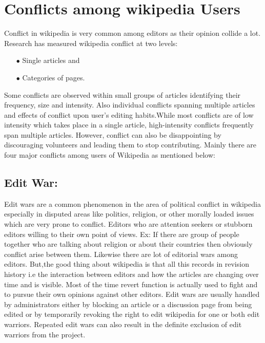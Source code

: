 \documentclass[12pt]{article}
\begin{document}
\section{Conflicts among wikipedia Users}
Conflict in wikipedia is very common among editors as their opinion collide a lot. Research has measured wikipedia conflict at two levels: 
\begin{itemize}
\item[$\bullet$ ]Single articles and
 \item[$\bullet$ ]Categories of pages.
\end{itemize}
Some conflicts are observed within small groups of articles identifying their frequency, size and intensity. Also individual conflicts spanning multiple articles and effects of conflict upon user's editing habits\cite{char}.While most conflicts are of low intensity which takes place in a single article, high-intensity conflicts frequently span multiple articles. However, conflict can also be disappointing by discouraging volunteers and leading them to stop contributing.
Mainly there are four major conflicts among users of Wikipedia \cite{main} as mentioned below:
\subsection*{Edit War:} Edit wars are a common phenomenon in the area of political conflict in wikipedia especially in disputed areas like politics, religion, or other morally loaded issues which are very prone to conflict. Editors who are attention seekers or stubborn editors willing to their own point of views. Ex: If there are group of people together who are talking about religion or about their countries  then  obviously conflict arise between them. Likewise there are lot of editorial wars among editors. But,the good thing about wikipedia is that all this records in revision history i.e the interaction between editors and how the articles are changing over time and is visible. Most of the time revert function is actually used to fight and to pursue their own opinions against other editors.                                                                           Edit wars are usually handled by administrators either by blocking an article or a discussion page from being edited or by temporarily revoking the right to edit wikipedia for one or both edit warriors. Repeated edit wars can also result in the definite exclusion of edit warriors from the project.
\end{document}
